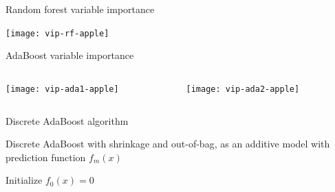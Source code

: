 \begin{frame}{Random forest variable importance}

\begin{center}
\texttt{[image: vip-rf-apple]}
\end{center}

\end{frame}

\begin{frame}{AdaBoost variable importance}

\begin{columns}[T]
\hspace*{-3.9em}%
\begin{column}{0.5\textwidth}
	\texttt{[image: vip-ada1-apple]}
\end{column}
\hspace*{-1em}%
\begin{column}{0.5\textwidth}
	\texttt{[image: vip-ada2-apple]}
\end{column}
\end{columns}

\end{frame}


\begin{frame}[fragile]{Discrete AdaBoost algorithm}

Discrete AdaBoost with shrinkage and out-of-bag, as an additive model with prediction function $f_m(x)$

{%
\setlength{\interspacetitleruled}{0pt}%
\setlength{\algotitleheightrule}{0pt}%
\begin{algorithm}[H]
Initialize $f_0(x)=0$\;
\end{algorithm}}

\end{frame}

